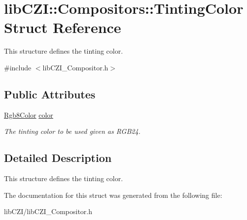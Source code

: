 \hypertarget{structlib_c_z_i_1_1_compositors_1_1_tinting_color}{}\section{lib\+C\+ZI\+:\+:Compositors\+:\+:Tinting\+Color Struct Reference}
\label{structlib_c_z_i_1_1_compositors_1_1_tinting_color}


This structure defines the tinting color.  




{\ttfamily \#include $<$lib\+C\+Z\+I\+\_\+\+Compositor.\+h$>$}

\subsection*{Public Attributes}
\begin{DoxyCompactItemize}
\item 
\mbox{\label{structlib_c_z_i_1_1_compositors_1_1_tinting_color_ac703e2b5d55edd041a3fc4974709a3ce}} 
\hyperlink{structlib_c_z_i_1_1_rgb8_color}{Rgb8\+Color} \hyperlink{structlib_c_z_i_1_1_compositors_1_1_tinting_color_ac703e2b5d55edd041a3fc4974709a3ce}{color}
\begin{DoxyCompactList}\small\item\em The tinting color to be used given as R\+G\+B24. \end{DoxyCompactList}\end{DoxyCompactItemize}


\subsection{Detailed Description}
This structure defines the tinting color. 

The documentation for this struct was generated from the following file\+:\begin{DoxyCompactItemize}
\item 
lib\+C\+Z\+I/lib\+C\+Z\+I\+\_\+\+Compositor.\+h\end{DoxyCompactItemize}
